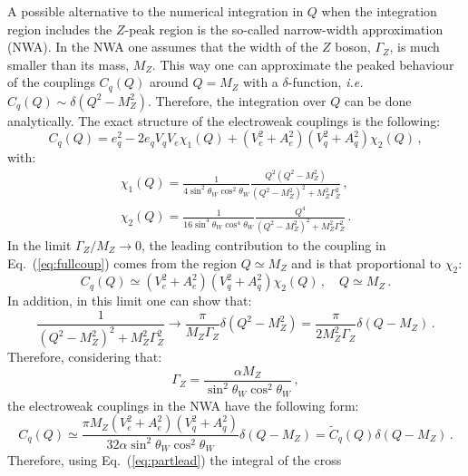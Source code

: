 \documentclass[10pt,a4paper]{article}
\begin{document}
A possible alternative to the numerical integration in $Q$ when the
integration region includes the $Z$-peak region is the so-called
narrow-width approximation (NWA). In the NWA one assumes that the
width of the $Z$ boson, $\Gamma_Z$, is much smaller than its mass,
$M_Z$. This way one can approximate the peaked behaviour of the
couplings $C_q(Q)$ around $Q=M_Z$ with a $\delta$-function,
\textit{i.e.}  $C_q(Q)\sim \delta(Q^2-M_Z^2)$. Therefore, the
integration over $Q$ can be done analytically. The exact structure of
the electroweak couplings is the following:
\begin{equation}\label{eq:fullcoup}
C_q(Q) = e_q^2 - 2 e_q V_q V_e \chi_1(Q) + (V_e^2 + A_e^2)(V_q^2 + A_q^2)\chi_2(Q)\,,
\end{equation}
with:
\begin{equation}
\begin{array}{l}
\displaystyle \chi_1(Q) = \frac{1}{4 \sin^2\theta_W \cos^2\theta_W } \frac{Q^2 ( Q^2 -  M_Z^2 )}{ (Q^2 - M_Z^2)^2 + M_Z^2 \Gamma_Z^2} \,,\\
\displaystyle \chi_2(Q) = \frac{1}{16 \sin^4\theta_W\cos^4\theta_W} \frac{Q^4}{ (Q^2 - M_Z^2)^2 + M_Z^2 \Gamma_Z^2} \,.
\end{array}
\end{equation}
In the limit $\Gamma_Z/M_Z\rightarrow 0$, the leading contribution to
the coupling in Eq.~(\ref{eq:fullcoup}) comes from the region
$Q\simeq M_Z$ and is that proportional to $\chi_2$:
\begin{equation}\label{eq:partlead}
C_q(Q) \simeq (V_e^2 + A_e^2)(V_q^2 + A_q^2)\chi_2(Q)\,,\quad Q\simeq M_Z\,.
\end{equation}
In addition, in this limit one can show that:
\begin{equation}\label{eq:breitwigner}
\frac{1}{ (Q^2 - M_Z^2)^2 + M_Z^2 \Gamma_Z^2}\rightarrow
\frac{\pi}{M_Z\Gamma_Z}\delta(Q^2-M_Z^2) = \frac{\pi}{2M_Z^2\Gamma_Z}\delta(Q-M_Z)\,.
\end{equation}
Therefore, considering that:
\begin{equation}
\Gamma_Z = \frac{\alpha M_Z}{\sin^2\theta_W \cos^2\theta_W}\,,
\end{equation}
the electroweak couplings in the NWA have the following form:
\begin{equation}
  C_q(Q) \simeq \frac{\pi M_Z (V_e^2 + A_e^2)(V_q^2 + A_q^2) }{32 \alpha
    \sin^2\theta_W\cos^2\theta_W} \delta(Q-M_Z)=\widetilde{C}_q(Q) \delta(Q-M_Z)\,.
\end{equation}
Therefore, using Eq.~(\ref{eq:partlead}) the integral of the cross
\end{document}
